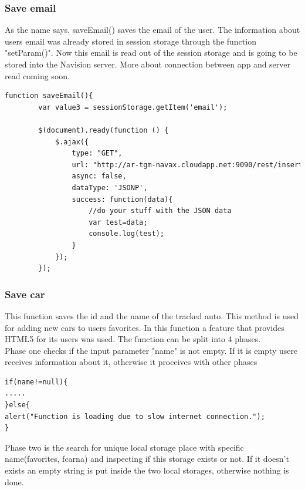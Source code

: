\subsubsection{Save email}
As the name says, saveEmail() saves the email of the user. The information about users email was already stored in session storage through the function "setParam()". Now this email is read out of the session storage and is going to be stored into the Navision server. More about connection between app and server read coming soon.
\\

\begin{lstlisting}[language=html, caption= 
start timer function,captionpos=b]
function saveEmail(){    
        var value3 = sessionStorage.getItem('email');
        
        $(document).ready(function () {
            $.ajax({
                type: "GET",
                url: "http://ar-tgm-navax.cloudapp.net:9090/rest/insertAndroidEmail/"+value3+"/ac73f229f1fb88a8719e5f6d295bee45?callback=?",
                async: false,
                dataType: 'JSONP',
                success: function(data){
                    //do your stuff with the JSON data
                    var test=data;
                    console.log(test);
                }
            });
        });

\end{lstlisting}

\subsubsection{Save car}
This function saves the id and the name of the tracked auto. This method is used for adding new cars to users favorites.  In this function a feature that provides HTML5 for its users was used. The function can be split into 4 phases.
\\

Phase one checks if the input parameter "name" is not empty. If it is empty usere receives information about it, otherwise it proceives with other phases

\begin{lstlisting}[language=html, caption= 
start timer function,captionpos=b]
if(name!=null){
.....
}else{
alert("Function is loading due to slow internet connection.");
}
\end{lstlisting}

Phase two is the search for unique local storage place with specific name(favorites, fcarna) and inspecting if this storage exists or not. If it doesn't exists an empty string is put inside the two local storages, otherwise nothing is done.
\\


